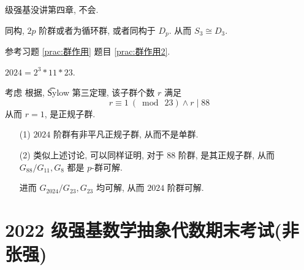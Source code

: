  级强基没讲第四章, 不会.

\problem[题目 6]

\begin{solution}
	同构, $2p$ 阶群或者为循环群, 或者同构于 $D_p$. 从而 $S_3\cong D_3$.
\end{solution}

\problem[题目 7] 参考习题 \ref{prac:群作用} 题目 \ref{prac:群作用2}.

\problem[题目 8]

\begin{solution}
	$2024=2^3*11*23$.
	
	考虑 \Sy[23] 根据, \t{Sylow} 第三定理, 该子群个数 $r$ 满足 $$r\equiv 1\ (\bmod\ 23)\wedge r\mid 88$$ 从而 $r=1$, \Sy[23] 是正规子群.
	
	\begin{itemize}
		\item[(1)] $2024$ 阶群有非平凡正规子群, 从而不是单群.
		\item[(2)] 类似上述讨论, 可以同样证明, 对于 $88$ 阶群, \Sy[11] 是其正规子群, 从而 $G_{88}/G_{11},G_{8}$ 都是 $p$-群可解.
		
		进而 $G_{2024}/G_{23},G_{23}$ 均可解, 从而 $2024$ 阶群可解.
		
	\end{itemize}
\end{solution}
\newpage
\section{2022 级强基数学抽象代数期末考试(非张强)}